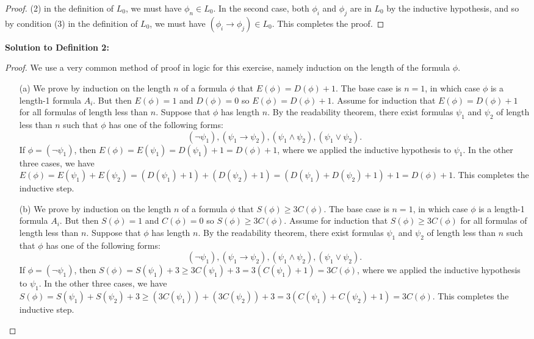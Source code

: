 \documentclass{article}
\begin{document}
\begin{proof}
 (2) in the definition of \(L_0\), we must have \(\phi_n \in L_0\). In the second case, both \(\phi_i\) and \(\phi_j\) are in \(L_0\) by the inductive hypothesis, and so by condition (3) in the definition of \(L_0\), we must have \((\phi_i \to \phi_j) \in L_0\). This completes the proof.
\end{proof}

\textbf{Solution to Definition 2:}
\begin{proof}
We use a very common method of proof in logic for this exercise, namely induction on the length of the formula \(\phi\).

\begin{itemize}
    \item[(a)] We prove by induction on the length \(n\) of a formula \(\phi\) that \(E(\phi) = D(\phi) + 1\). The base case is \(n = 1\), in which case \(\phi\) is a length-1 formula \(A_i\). But then \(E(\phi) = 1\) and \(D(\phi) = 0\) so \(E(\phi) = D(\phi) + 1\). Assume for induction that \(E(\phi) = D(\phi) + 1\) for all formulas of length less than \(n\). Suppose that \(\phi\) has length \(n\). By the readability theorem, there exist formulas \(\psi_1\) and \(\psi_2\) of length less than \(n\) such that \(\phi\) has one of the following forms:
    \[
    (\neg \psi_1), (\psi_1 \to \psi_2), (\psi_1 \land \psi_2), (\psi_1 \lor \psi_2).
    \]
    If \(\phi = (\neg \psi_1)\), then \(E(\phi) = E(\psi_1) = D(\psi_1) + 1 = D(\phi) + 1\), where we applied the inductive hypothesis to \(\psi_1\). In the other three cases, we have \(E(\phi) = E(\psi_1) + E(\psi_2) = (D(\psi_1) + 1) + (D(\psi_2) + 1) = (D(\psi_1) + D(\psi_2) + 1) + 1 = D(\phi) + 1\). This completes the inductive step.
    
    \item[(b)] We prove by induction on the length \(n\) of a formula \(\phi\) that \(S(\phi) \geq 3C(\phi)\). The base case is \(n = 1\), in which case \(\phi\) is a length-1 formula \(A_i\). But then \(S(\phi) = 1\) and \(C(\phi) = 0\) so \(S(\phi) \geq 3C(\phi)\). Assume for induction that \(S(\phi) \geq 3C(\phi)\) for all formulas of length less than \(n\). Suppose that \(\phi\) has length \(n\). By the readability theorem, there exist formulas \(\psi_1\) and \(\psi_2\) of length less than \(n\) such that \(\phi\) has one of the following forms:
    \[
    (\neg \psi_1), (\psi_1 \to \psi_2), (\psi_1 \land \psi_2), (\psi_1 \lor \psi_2).
    \]
    If \(\phi = (\neg \psi_1)\), then \(S(\phi) = S(\psi_1) + 3 \geq 3C(\psi_1) + 3 = 3(C(\psi_1) + 1) = 3C(\phi)\), where we applied the inductive hypothesis to \(\psi_1\). In the other three cases, we have \(S(\phi) = S(\psi_1) + S(\psi_2) + 3 \geq (3C(\psi_1)) + (3C(\psi_2)) + 3 = 3(C(\psi_1) + C(\psi_2) + 1) = 3C(\phi)\). This completes the inductive step.
\end{itemize}
\end{proof}
\end{document}
